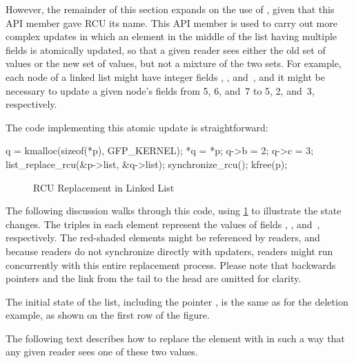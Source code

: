 However, the remainder of this section expands on the use of
, given that this API member gave RCU its name.
This API member is used to carry out more complex updates in which an
element in the middle of the list having multiple fields is atomically
updated, so that a given reader sees either the old set of values or
the new set of values, but not a mixture of the two sets.
For example, each node of a linked list might have integer fields
, , and~, and it might be necessary to update
a given node's fields from 5, 6, and~7 to 5, 2, and~3, respectively.

The code implementing this atomic update is straightforward:

\begin{fcvlabel}
\begin{VerbatimN}[samepage=true,commandchars=\\\[\],firstnumber=15]
q = kmalloc(sizeof(*p), GFP_KERNEL);	\lnlbl[kmalloc]
*q = *p;				\lnlbl[copy]
q->b = 2;				\lnlbl[update1]
q->c = 3;				\lnlbl[update2]
list_replace_rcu(&p->list, &q->list);	\lnlbl[replace]
synchronize_rcu();			
kfree(p);				\lnlbl[kfree]
\end{VerbatimN}
\end{fcvlabel}

\begin{figure}
\centering
{}
\caption{RCU Replacement in Linked List}
\label{fig:defer:RCU Replacement in Linked List}
\end{figure}

The following discussion walks through this code, using
\cref{fig:defer:RCU Replacement in Linked List} to illustrate
the state changes.
The triples in each element represent the values of fields ,
, and~, respectively.
The red-shaded elements might be referenced by readers,
and because readers do not synchronize directly with updaters,
readers might run concurrently with this entire replacement process.
Please note that backwards pointers and the link from the tail to the
head are omitted for clarity.

The initial state of the list, including the pointer ,
is the same as for the deletion example, as shown on the
first row of the figure.

The following text describes how to replace the  element
with  in such a way that any given reader sees one of these
two values.

